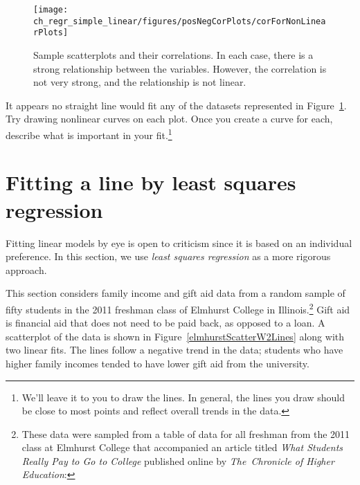 \begin{figure}
   \centering
   \texttt{[image: ch\_regr\_simple\_linear/figures/posNegCorPlots/corForNonLinearPlots]}
   \caption{Sample scatterplots and their correlations. In each case, there is a strong relationship between the variables. However, the correlation is not very strong, and the relationship is not linear.}
   \label{corForNonLinearPlots}
\end{figure}

\begin{exercise}
It appears no straight line would fit any of the datasets represented in Figure~\ref{corForNonLinearPlots}. Try drawing nonlinear curves on each plot. Once you create a curve for each, describe what is important in your fit.\footnote{We'll leave it to you to draw the lines. In general, the lines you draw should be close to most points and reflect overall trends in the data.}
\end{exercise}


\section[Fitting a line by least squares regression]{Fitting a line by least squares regression ~}
\label{fittingALineByLSR}


Fitting linear models by eye is open to criticism since it is based on an individual preference. In this section, we use \emph{least squares regression} as a more rigorous approach.

This section considers family income and gift aid data from a random sample of fifty students in the 2011 freshman class of Elmhurst College in Illinois.\footnote{These data were sampled from a table of data for all freshman from the 2011 class at Elmhurst College that accompanied an article titled \emph{What Students Really Pay to Go to College} published online by \emph{The~Chronicle of Higher Education}: } Gift aid is financial aid that does not need to be paid back, as opposed to a loan. A scatterplot of the data is shown in Figure~\ref{elmhurstScatterW2Lines} along with two linear fits. The lines follow a negative trend in the data; students who have higher family incomes tended to have lower gift aid from the university.

